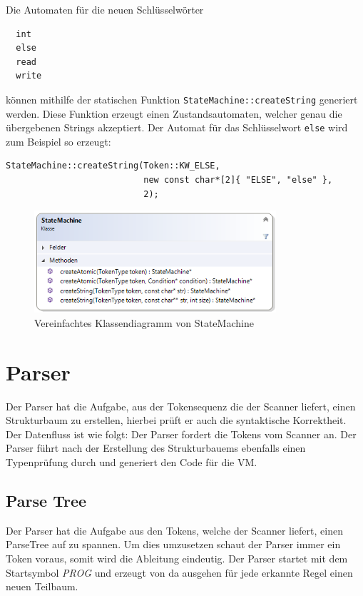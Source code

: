 \documentclass[
a4paper
]{scrreprt}
\begin{document}
Die Automaten für die neuen Schlüsselwörter    
\begin{lstlisting}     
  int
  else
  read
  write
\end{lstlisting}    
können mithilfe der statischen Funktion \lstinline{StateMachine::createString} generiert werden. Diese Funktion erzeugt einen Zustandsautomaten, welcher genau die übergebenen Strings akzeptiert. Der Automat für das Schlüsselwort \lstinline{else} wird zum Beispiel so erzeugt:
\begin{lstlisting}
StateMachine::createString(Token::KW_ELSE, 
                           new const char*[2]{ "ELSE", "else" }, 
                           2);
\end{lstlisting}

\begin{figure}
\centering
\includegraphics[width=0.8\textwidth]{./images/statemachine.png}
\caption{Vereinfachtes Klassendiagramm von StateMachine}
\end{figure}

\chapter{Parser}
Der Parser hat die Aufgabe, aus der Tokensequenz die der Scanner liefert, einen Strukturbaum zu erstellen, hierbei prüft er auch die syntaktische Korrektheit. Der Datenfluss ist wie folgt: Der Parser fordert die Tokens vom Scanner an. Der Parser führt nach der Erstellung des Strukturbauems ebenfalls einen Typenprüfung durch und generiert den Code für die VM.
\section{Parse Tree}
Der Parser hat die Aufgabe aus den Tokens, welche der Scanner liefert, einen ParseTree auf zu spannen.  Um dies umzusetzen schaut der Parser immer ein Token voraus, somit wird die Ableitung eindeutig. Der Parser startet mit dem Startsymbol \textit{PROG} und erzeugt von da ausgehen für jede erkannte Regel einen neuen Teilbaum.\\
\end{document}

